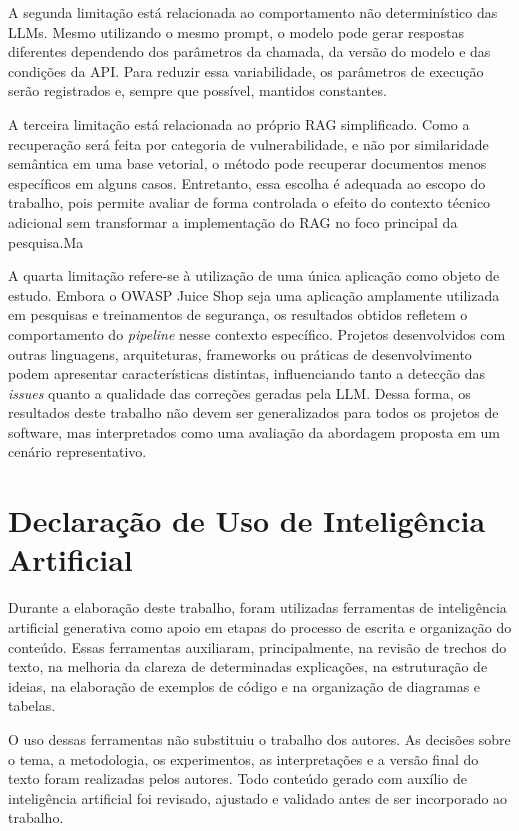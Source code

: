 A segunda limitação está relacionada ao comportamento não determinístico das LLMs. Mesmo utilizando o mesmo prompt, o modelo pode gerar respostas diferentes dependendo dos parâmetros da chamada, da versão do modelo e das condições da API. Para reduzir essa variabilidade, os parâmetros de execução serão registrados e, sempre que possível, mantidos constantes.

A terceira limitação está relacionada ao próprio RAG simplificado. Como a recuperação será feita por categoria de vulnerabilidade, e não por similaridade semântica em uma base vetorial, o método pode recuperar documentos menos específicos em alguns casos. Entretanto, essa escolha é adequada ao escopo do trabalho, pois permite avaliar de forma controlada o efeito do contexto técnico adicional sem transformar a implementação do RAG no foco principal da pesquisa.Ma

A quarta limitação refere-se à utilização de uma única aplicação como objeto de estudo. Embora o OWASP Juice Shop seja uma aplicação amplamente utilizada em pesquisas e treinamentos de segurança, os resultados obtidos refletem o comportamento do \textit{pipeline} nesse contexto específico. Projetos desenvolvidos com outras linguagens, arquiteturas, frameworks ou práticas de desenvolvimento podem apresentar características distintas, influenciando tanto a detecção das \textit{issues} quanto a qualidade das correções geradas pela LLM. Dessa forma, os resultados deste trabalho não devem ser generalizados para todos os projetos de software, mas interpretados como uma avaliação da abordagem proposta em um cenário representativo.

\section{Declaração de Uso de Inteligência Artificial}

Durante a elaboração deste trabalho, foram utilizadas ferramentas de inteligência artificial generativa como apoio em etapas do processo de escrita e organização do conteúdo. Essas ferramentas auxiliaram, principalmente, na revisão de trechos do texto, na melhoria da clareza de determinadas explicações, na estruturação de ideias, na elaboração de exemplos de código e na organização de diagramas e tabelas.

O uso dessas ferramentas não substituiu o trabalho dos autores. As decisões sobre o tema, a metodologia, os experimentos, as interpretações e a versão final do texto foram realizadas pelos autores. Todo conteúdo gerado com auxílio de inteligência artificial foi revisado, ajustado e validado antes de ser incorporado ao trabalho.

